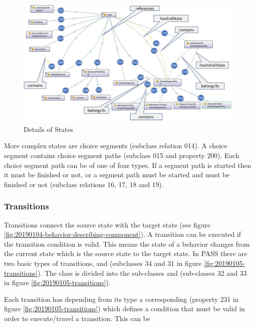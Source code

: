 \begin{figure}[htbp]
	\centering
	\includegraphics[width=1.0\linewidth]{Figures/Ontology/SubjectBehavior/20190109-States}
	\caption[Details of States]{Details of States}
	\label{fig:20190109-states}
\end{figure}

More complex states are choice segments (subclass relation 014). A choice segment contains choice segment paths (subclass 015 and property 200). Each choice segment path can be of one of four types. If a segment path is started then it must be finished or not, or a segment path must be started and must be finished or not (subclass relations 16, 17, 18 and 19).

\subsubsection{Transitions}

Transitions connect the source state with the target state (see figure \ref{fig:20190104-behavior-describing-component}). A transition can be executed if the transition condition is valid. This means the state of a behavior changes from the current state which is the source state to the target state. In PASS there are two basic types of transitions,  and  (subclasses 34 and 31 in figure \ref{fig:20190105-transitions}). The class  is divided into the sub-classes  and  (sub-classes 32 and 33 in figure \ref{fig:20190105-transitions}).

Each transition has depending from its type a corresponding  (property 231 in figure  \ref{fig:20190105-transitions}) which defines a condition that must be valid in order to execute/travel a transition. This can be 

